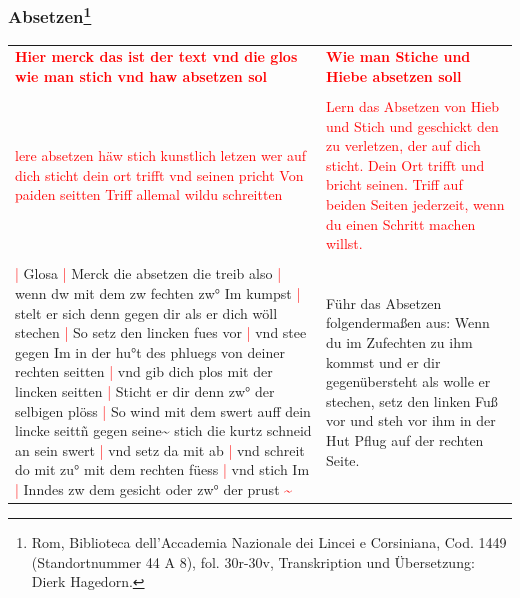 \newpage

\begin{center}
\end{center}

\newpage

\subsubsection[Absetzen]{
    Absetzen\footnote{
        \hspace*{0.5ex}Rom, Biblioteca dell'Accademia Nazionale dei Lincei e Corsiniana,
        Cod. 1449 (Standortnummer 44 A 8), fol. 30r-30v, Transkription und Übersetzung: Dierk Hagedorn.}}

\begin{longtable}{p{6.25cm}p{6.25cm}}
    \textbf{\textcolor{red}{
        Hier merck das ist der text vnd die glos wie man stich vnd haw absetzen sol}}
    &
    \textbf{\textcolor{red}{
        Wie man Stiche und Hiebe absetzen soll}}
    \\
    \\
    \textcolor{red}{
        lere absetzen häw stich kunstlich letzen wer auf dich sticht
        dein ort trifft vnd seinen pricht
        Von paiden seitten Triff allemal wildu schreitten}
    &
    \textcolor{red}{
        Lern das Absetzen von Hieb und Stich und geschickt den zu verletzen, der auf dich sticht.
        Dein Ort trifft und bricht seinen.
        Triff auf beiden Seiten jederzeit, wenn du einen Schritt machen willst.}
    \\
    \\
    \textcolor{red}{|} Glosa
    \textcolor{red}{|} Merck die absetzen die treib also
    \textcolor{red}{|} wenn dw mit dem zw fechten zw° Im kumpst
    \textcolor{red}{|} stelt er sich denn gegen dir als er dich wöll stechen
    \textcolor{red}{|} So setz den lincken fues vor
    \textcolor{red}{|} vnd stee gegen Im in der hu°t des phluegs von deiner rechten seitten
    \textcolor{red}{|} vnd gib dich plos mit der lincken seitten
    \textcolor{red}{|} Sticht er dir denn zw° der selbigen plöss
    \textcolor{red}{|} So wind mit dem swert auff dein lincke seittñ gegen seine\textasciitilde{} stich die kurtz schneid an sein swert
    \textcolor{red}{|} vnd setz da mit ab
    \textcolor{red}{|} vnd schreit do mit zu° mit dem rechten füess
    \textcolor{red}{|} vnd stich Im
    \textcolor{red}{|} Inndes zw dem gesicht oder zw° der prust \textcolor{red}{\textasciitilde{}}
    &
    Führ das Absetzen folgendermaßen aus: Wenn du im Zufechten zu ihm kommst und er dir gegenübersteht als wolle er stechen, setz den linken Fuß vor und steh vor ihm in der Hut Pflug auf der rechten Seite.

\end{longtable}
